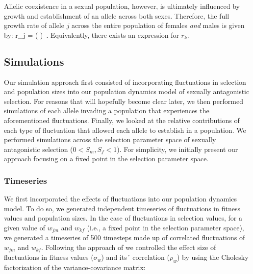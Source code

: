 \documentclass[12pt]{article}
\let\oldequation\equation
\let\oldendequation\endequation
\renewenvironment{equation}
  {\linenomathNonumbers\oldequation}
  {\oldendequation\endlinenomath}
\begin{document}
Allelic coexistence in a sexual population, however, is ultimately influenced by growth and establishment of an allele across both sexes. Therefore, the full growth rate of allele $j$ across the entire population of females \emph{and} males is given by:
\begin{equation}
    r_{j} = \ln \left(   \right) \,.
    \label{full}
\end{equation}
Equivalently, there exists an expression for $r_{k}$.


\subsection*{Simulations}


Our simulation approach first consisted of incorporating fluctuations in selection and population sizes into our population dynamics model of sexually antagonistic selection. For reasons that will hopefully become clear later, we then performed simulations of each allele invading a population that experiences the aforementioned fluctuations. Finally, we looked at the relative contributions of each type of fluctuation that allowed each allele to establish in a population. We performed simulations across the selection parameter space of sexually antagonistic selection ($0 < S_{m}, S_{f} < 1$). For simplicity, we initially present our approach focusing on a fixed point in the selection parameter space.



\subsubsection*{Timeseries}

We first incorporated the effects of fluctuations into our population dynamics model. To do so, we generated independent timeseries of fluctuations in fitness values and population sizes. In the case of fluctuations in selection values, for a given value of $w_{jm}$ and $w_{kf}$ (i.e., a fixed point in the selection parameter space), we generated a timeseries of 500 timesteps made up of correlated fluctuations of $w_{jm}$ and $w_{kf}$. Following the approach of  \citet{shoemaker2020} we controlled the effect size of  fluctuations in fitness values ($\sigma_{w}$) and its´ correlation ($\rho_{w}$) by  using the Cholesky factorization of the variance-covariance matrix:
\end{document}
